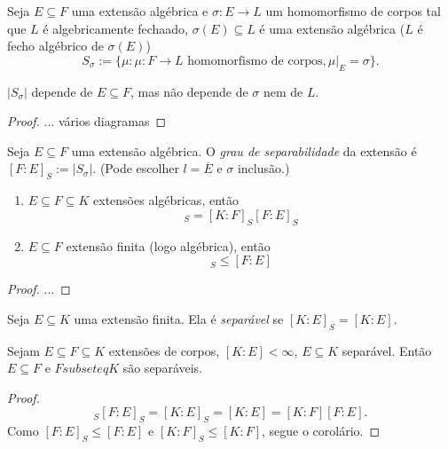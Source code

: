 \begin{defi}
	Seja $E \subseteq F$ uma extensão algébrica e $\sigma:E \to L$ um homomorfismo de corpos tal que $L$ é algebricamente fechaado, $\sigma(E) \subseteq L$ é uma extensão algébrica ($L$ é fecho algébrico de $\sigma(E)$)
	\begin{equation*}
	S_\sigma := \{\mu : \mu: F \to L \text{\ homomorfismo de corpos}, \mu|_E=\sigma\}.
	\end{equation*}
\end{defi}

\begin{lema}
	$|S_\sigma|$ depende de $E \subseteq F$, mas não depende de $\sigma$ nem de $L$.
\end{lema}
\begin{proof}
... vários diagramas
\end{proof}

\begin{defi}
	Seja $E \subseteq F$ uma extensão algébrica. O \emph{grau de separabilidade} da extensão é $[F:E]_S := |S_\sigma|$. (Pode escolher $l=\overline{E}$ e $\sigma$ inclusão.)
\end{defi}

\begin{teo}
	\begin{enumerate}
	\item $E \subseteq F \subseteq K$ extensões algébricas, então
		\begin{equation*}
		[K:E]_S = [K:F]_S[F:E]_S
		\end{equation*}
	\item $E \subseteq F$ extensão finita (logo algébrica), então
		\begin{equation*}
		[F:E]_S \leq [F:E]
		\end{equation*}
	\end{enumerate}
\end{teo}
\begin{proof}
...
\end{proof}

\begin{defi}
	Seja $E \subseteq K$ uma extensão finita. Ela é \emph{separável} se $[K:E]_S=[K:E]$.
\end{defi}

\begin{coro}
	Sejam $E \subseteq F \subseteq K$ extensões de corpos, $[K:E] < \infty$, $E \subseteq K$ separável. Então $E \subseteq F$ e $F subseteq K$ são separáveis.
\end{coro}
\begin{proof}
	\begin{equation*}
	[K:F]_S [F:E]_S = [K:E]_S = [K:E] = [K:F][F:E].
	\end{equation*}
	Como $[F:E]_S \leq [F:E]$ e $[K:F]_S \leq [K:F]$, segue o corolário.
\end{proof}


